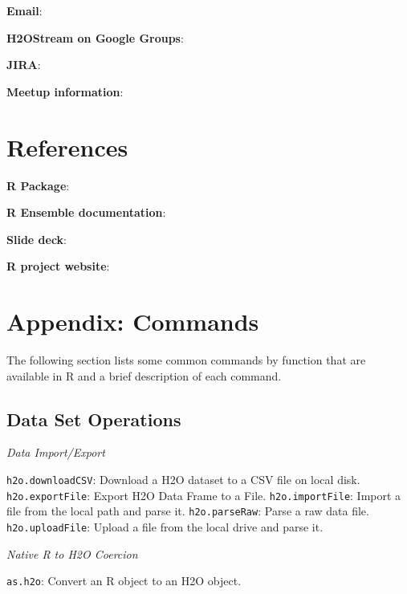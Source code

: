 \documentclass[11pt]{article}
\begin{document}
{{\textbf{Email}}: {}

{\textbf{H2OStream on Google Groups}}: {} 

{\textbf{JIRA}}: {}

{\textbf{Meetup information}}: {}

\newpage
\section{References}\bigskip


{\bfseries{R Package}}:  

{\bfseries{R Ensemble documentation}}:  

{\bfseries{Slide deck}}:  

{\bfseries{R project website}}:  


\section{Appendix: Commands} \label{Appendix} 

The following section lists some common commands by function that are available in R and a brief description of each command. 
\subsection {Data Set Operations}
{\emph{Data Import/Export}}\par
{\texttt{h2o.downloadCSV}}: Download a H2O dataset to a CSV file on local disk.\newline
{\texttt{h2o.exportFile}}: Export H2O Data Frame to a File.\newline
{\texttt{h2o.importFile}}: Import a file from the local path and parse it.\newline
{\texttt{h2o.parseRaw}}: Parse a raw data file. \newline
{\texttt{h2o.uploadFile}}: Upload a file from the local drive and parse it.\newline

{\emph{Native R to H2O Coercion}}\par
 {\texttt{as.h2o}}: Convert an R object to an H2O object.\newline


}
\end{document}

